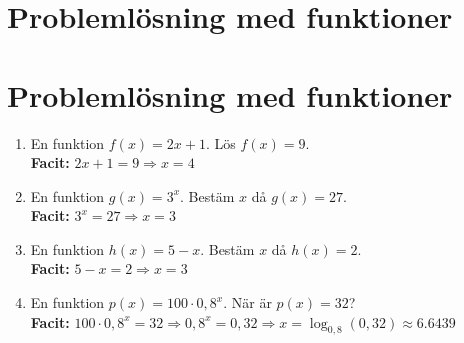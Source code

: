 \documentclass[a4paper,11pt]{article}
\begin{document}
\section*{Problemlösning med funktioner}


\newpage
\section*{Problemlösning med funktioner}

\begin{enumerate}[label=\textbf{\arabic*.}]
    \item En funktion $f(x) = 2x + 1$. Lös $f(x) = 9$.
    \\ \textbf{Facit:} $2x+1=9 \Rightarrow x=4$
    \item En funktion $g(x) = 3^x$. Bestäm $x$ då $g(x) = 27$.
    \\ \textbf{Facit:} $3^x=27 \Rightarrow x=3$
    \item En funktion $h(x) = 5 - x$. Bestäm $x$ då $h(x) = 2$.
    \\ \textbf{Facit:} $5-x=2 \Rightarrow x=3$
    \item En funktion $p(x) = 100 \cdot 0,8^x$. När är $p(x) = 32$?
    \\ \textbf{Facit:} $100\cdot0,8^x=32 \Rightarrow 0,8^x=0,32 \Rightarrow x=\log_{0,8}(0,32) \approx 6.6439$
\end{enumerate}
\end{document}

